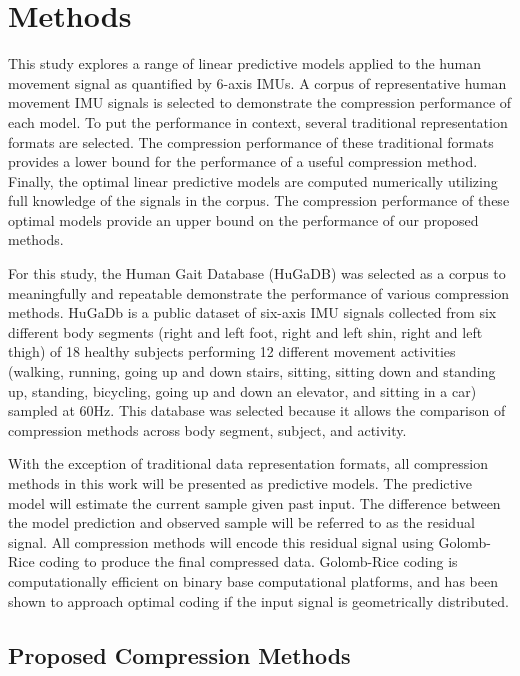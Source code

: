 \documentclass[journal]{IEEEtran}
\begin{document}
\section{Methods}
This study explores a range of linear predictive models applied to the human movement signal as quantified by 6-axis IMUs. A corpus of representative human movement IMU signals is selected to demonstrate the compression performance of each model. To put the performance in context, several traditional representation formats are selected. The compression performance of these traditional formats provides a lower bound for the performance of a useful compression method. Finally, the optimal linear predictive models are computed numerically utilizing full knowledge of the signals in the corpus. The compression performance of these optimal models provide an upper bound on the performance of our proposed methods.

For this study, the Human Gait Database (HuGaDB)\cite{Chereshnev2018} was selected as a corpus to meaningfully and repeatable demonstrate the performance of various compression methods. HuGaDb is a public dataset of six-axis IMU signals collected from six different body segments (right and left foot, right and left shin, right and left thigh) of 18 healthy subjects performing 12 different movement activities (walking, running, going up and down stairs, sitting, sitting down and standing up, standing, bicycling, going up and down an elevator, and sitting in a car) sampled at 60Hz. This database was selected because it allows the comparison of compression methods across body segment, subject, and activity.

With the exception of traditional data representation formats, all compression methods in this work will be presented as predictive models. The predictive model will estimate the current sample given past input. The difference between the model prediction and observed sample will be referred to as the residual signal. All compression methods will encode this residual signal using Golomb-Rice coding to produce the final compressed data. Golomb-Rice coding is computationally efficient on binary base computational platforms, and has been shown to approach optimal coding if the input signal is geometrically distributed\cite{Golomb1966}\cite{F.Rice1979}.

\subsection{Proposed Compression Methods}
\end{document}
